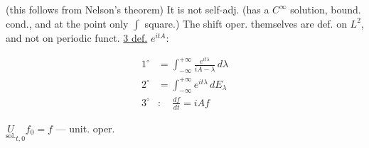 (this follows from Nelson's theorem)
It is not self-adj. (has a $C^\infty$ solution, bound. cond., and at the point only $\int$ square.)
The shift oper. themselves are def. on $L^2$, and not on periodic funct.
\underline{3 def.}
$e^{itA}$:
\par\noindent\begin{minipage}{\linewidth}
\begin{align*}
1^\circ&=\int_{-\infty}^{+\infty}\frac{e^{it\lambda}}{iA-\lambda}\,d\lambda\\
2^\circ&=\int_{-\infty}^{+\infty}e^{it\lambda}\,dE_\lambda\\
3^\circ&:\quad \frac{df}{dt}=iAf
\end{align*}
\end{minipage}\par
$\underset{\text{sol.}}{U}_{t,0}f_0=f$ --- unit. oper.

